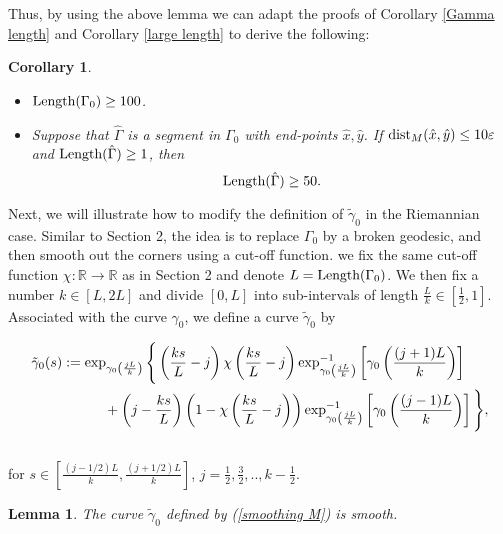 \documentclass[a4paper, reqno]{amsart}
\newtheorem{lemma}[theorem]{Lemma}
\newtheorem{corollary}[theorem]{Corollary}
\theoremstyle{definition}
\theoremstyle{remark}
\numberwithin{equation}{section}
\newcommand{\dist}{\textup{dist}}
\newcommand{\Len}{\textup{Length}}
\numberwithin{equation}{section}
\numberwithin{equation}{section}
\begin{document}
Thus, by using the above lemma we can adapt the proofs of Corollary \ref{Gamma length} and Corollary \ref{large length} to derive the following:

\begin{corollary}{\label{large length M}}\
\begin{itemize}
	\item[(i)]	$\Len(\Gamma_0)\geq 100$.
	\item[(ii)] 	Suppose that $\hat{\Gamma}$ is a segment in $\Gamma_0$ with end-points $\hat{x}, \hat{y}$. If $\dist_M(\hat{x}, \hat{y})\leq 10\varepsilon$ and $\Len(\hat{\Gamma})\geq 1$, then 
	\[\Len(\hat{\Gamma})\geq 50.\]  	
\end{itemize}
\end{corollary}

\bigskip

Next, we will illustrate how to modify the definition of $\tilde{\gamma}_0$ in the Riemannian case.  Similar to Section 2, the idea is to replace $\Gamma_0$ by a broken geodesic, and then smooth out the corners using a cut-off function. we fix the same cut-off function $\chi:\mathbb{R}\to\mathbb{R}$ as in Section 2 and denote $L = \Len(\Gamma_0)$.  
We then fix a number $k\in [L, 2L]$ and divide $[0, L]$ into sub-intervals of length $\frac{L}{k}\in [\frac{1}{2}, 1]$.
Associated with the curve $\gamma_0$, we define a curve $\tilde{\gamma}_0$ by

\begin{align}{\label{smoothing M}}
	\tilde{\gamma}_0(s) &:= \exp_{\gamma_0\left(\frac{jL}{k}\right)} \Bigg\{ \left(\frac{ks}{L} - j\right)\chi\left(\frac{ks}{L} - j\right) \exp_{\gamma_0\left(\frac{jL}{k}\right)}^{-1}\left[\gamma_0\left(\frac{(j+1)L}{k}\right)\right]\notag\\
	&\quad\quad\quad + \left( j - \frac{ks}{L} \right)\left( 1 -\chi\left(\frac{ks}{L} - j\right)\right)\exp_{\gamma_0\left(\frac{jL}{k}\right)}^{-1}\left[ \gamma_0\left(\frac{(j-1)L}{k}\right) \right]\Bigg\},
\end{align}\\
for $s\in \left[\frac{(j - 1/2)L}{k}, \frac{(j + 1/2)L}{k}\right]$, $j = \frac{1}{2}, \frac{3}{2}, .., k -\frac{1}{2}$. 

\bigskip

\begin{lemma}{\label{geodesic}}
 The curve $\tilde{\gamma}_0$ defined by (\ref{smoothing M}) is smooth.	
\end{lemma}
\end{document}
